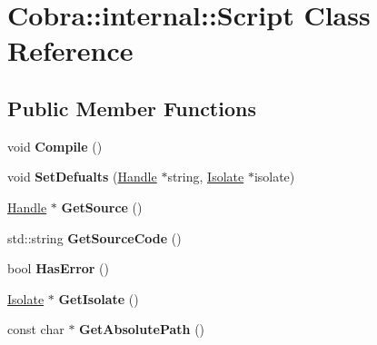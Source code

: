 \hypertarget{class_cobra_1_1internal_1_1_script}{\section{Cobra\+:\+:internal\+:\+:Script Class Reference}
\label{class_cobra_1_1internal_1_1_script}
}
\subsection*{Public Member Functions}
\begin{DoxyCompactItemize}
\item 
\hypertarget{class_cobra_1_1internal_1_1_script_a4bf8df38004b8c9e499b42d2f1141754}{void {\bfseries Compile} ()}\label{class_cobra_1_1internal_1_1_script_a4bf8df38004b8c9e499b42d2f1141754}

\item 
\hypertarget{class_cobra_1_1internal_1_1_script_a35c5a51f7ab2477b04715937ae0af949}{void {\bfseries Set\+Defualts} (\hyperlink{class_cobra_1_1internal_1_1_handle}{Handle} $\ast$string, \hyperlink{class_cobra_1_1internal_1_1_isolate}{Isolate} $\ast$isolate)}\label{class_cobra_1_1internal_1_1_script_a35c5a51f7ab2477b04715937ae0af949}

\item 
\hypertarget{class_cobra_1_1internal_1_1_script_af7e4c059682b56d466083f5ee2b0435d}{\hyperlink{class_cobra_1_1internal_1_1_handle}{Handle} $\ast$ {\bfseries Get\+Source} ()}\label{class_cobra_1_1internal_1_1_script_af7e4c059682b56d466083f5ee2b0435d}

\item 
\hypertarget{class_cobra_1_1internal_1_1_script_a4746657f2fd5d6f05d5a6c3a709e5d8b}{std\+::string {\bfseries Get\+Source\+Code} ()}\label{class_cobra_1_1internal_1_1_script_a4746657f2fd5d6f05d5a6c3a709e5d8b}

\item 
\hypertarget{class_cobra_1_1internal_1_1_script_a6280b18bbd397e78a6434fa32d82f004}{bool {\bfseries Has\+Error} ()}\label{class_cobra_1_1internal_1_1_script_a6280b18bbd397e78a6434fa32d82f004}

\item 
\hypertarget{class_cobra_1_1internal_1_1_script_ab9b6b9a9a8ef1dd7fdd697281d3b6e52}{\hyperlink{class_cobra_1_1internal_1_1_isolate}{Isolate} $\ast$ {\bfseries Get\+Isolate} ()}\label{class_cobra_1_1internal_1_1_script_ab9b6b9a9a8ef1dd7fdd697281d3b6e52}

\item 
\hypertarget{class_cobra_1_1internal_1_1_script_aa5518a367d696148e28218e204bc27fb}{const char $\ast$ {\bfseries Get\+Absolute\+Path} ()}\label{class_cobra_1_1internal_1_1_script_aa5518a367d696148e28218e204bc27fb}


\end{DoxyCompactItemize}
